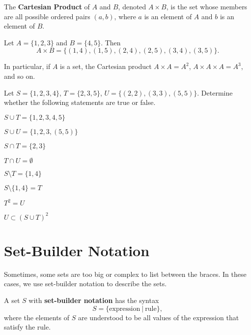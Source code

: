 \begin{definition}
    The \textbf{Cartesian Product} of $A$ and $B$, denoted $A \times B$, is the set whose members are all possible ordered pairs $(a, b)$, where $a$ is an element of $A$ and $b$ is an element of $B$.
\end{definition}
\begin{example}
    Let $A = \{1, 2, 3\}$ and $B = \{4, 5\}$. Then
    \[
        A \times B = \{(1, 4), (1, 5), (2, 4), (2, 5), (3, 4), (3, 5)\}.
    \]
\end{example}
\begin{remark}
    In particular, if $A$ is a set, the Cartesian product $A \times A = A^2$, $A\times A \times A = A^3$, and so on.
\end{remark}

\begin{exercise}
    Let $S = \{1, 2, 3, 4\}$, $T = \{2, 3, 5\}$, $U = \{(2, 2), (3, 3), (5, 5)\}$. Determine whether the following statements are true or false.
    \begin{multicols}{2}
        \begin{partquestions}{\alph*}
            \item $S \cup T = \{1, 2, 3, 4, 5\}$
            \item $S \cup U = \{1, 2, 3, (5, 5)\}$
            \item $S \cap T = \{2, 3\}$
            \item $T \cap U = \emptyset$
            \item $S \setminus T = \{1, 4\}$
            \item $S \setminus \{1, 4\} = T$
            \item $T^2 = U$
            \item $U \subset (S \cup T)^2$
        \end{partquestions}
    \end{multicols}
\end{exercise}

\section{Set-Builder Notation}
Sometimes, some sets are too big or complex to list between the braces. In these cases, we use set-builder notation to describe the sets.
\begin{definition}
    A set $S$ with \textbf{set-builder notation} has the syntax
    \[
        S = \{\mathrm{expression} \ | \ \mathrm{rule}\},
    \]
    where the elements of $S$ are understood to be all values of the {\normalfont expression} that satisfy the {\normalfont rule}.
\end{definition}


